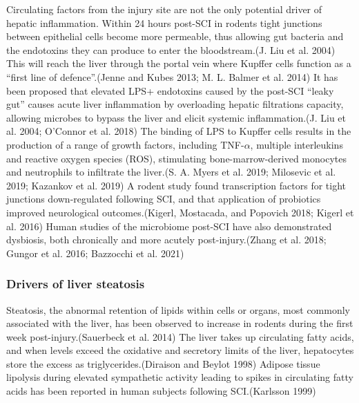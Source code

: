 \documentclass[9pt,lineno]{elife}
\begin{document}
Circulating factors from the injury site are not the only potential driver of hepatic inflammation.
Within 24 hours post-SCI in rodents tight junctions between epithelial cells become more permeable, thus allowing gut bacteria and the endotoxins they can produce to enter the bloodstream.(J. Liu et al. 2004)
This will reach the liver through the portal vein where Kupffer cells function as a ``first line of defence''.(Jenne and Kubes 2013; M. L. Balmer et al. 2014)
It has been proposed that elevated LPS+ endotoxins caused by the post-SCI ``leaky gut'' causes acute liver inflammation by overloading hepatic filtrations capacity, allowing microbes to bypass the liver and elicit systemic inflammation.(J. Liu et al. 2004; O'Connor et al. 2018)
The binding of LPS to Kupffer cells results in the production of a range of growth factors, including TNF-\(\alpha\), multiple interleukins and reactive oxygen species (ROS), stimulating bone-marrow-derived monocytes and neutrophils to infiltrate the liver.(S. A. Myers et al. 2019; Milosevic et al. 2019; Kazankov et al. 2019)
A rodent study found transcription factors for tight junctions down-regulated following SCI, and that application of probiotics improved neurological outcomes.(Kigerl, Mostacada, and Popovich 2018; Kigerl et al. 2016)
Human studies of the microbiome post-SCI have also demonstrated dysbiosis, both chronically and more acutely post-injury.(Zhang et al. 2018; Gungor et al. 2016; Bazzocchi et al. 2021)

\hypertarget{drivers-of-liver-steatosis}{%
\subsubsection{Drivers of liver steatosis}\label{drivers-of-liver-steatosis}}

Steatosis, the abnormal retention of lipids within cells or organs, most commonly associated with the liver, has been observed to increase in rodents during the first week post-injury.(Sauerbeck et al. 2014)
The liver takes up circulating fatty acids, and when levels exceed the oxidative and secretory limits of the liver, hepatocytes store the excess as triglycerides.(Diraison and Beylot 1998)
Adipose tissue lipolysis during elevated sympathetic activity leading to spikes in circulating fatty acids has been reported in human subjects following SCI.(Karlsson 1999)
\end{document}
